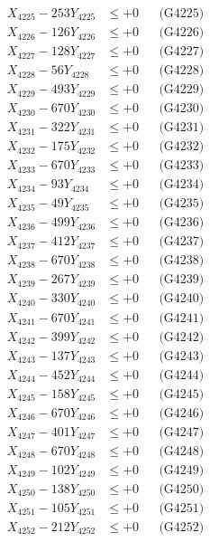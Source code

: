 \documentclass[a4paper,10pt]{article}
\begin{document}
{\begin{align}
X_{4225} - 253Y_{4225} &\leq +0 && \text{(G4225)} \\
X_{4226} - 126Y_{4226} &\leq +0 && \text{(G4226)} \\
X_{4227} - 128Y_{4227} &\leq +0 && \text{(G4227)} \\
X_{4228} - 56Y_{4228} &\leq +0 && \text{(G4228)} \\
X_{4229} - 493Y_{4229} &\leq +0 && \text{(G4229)} \\
X_{4230} - 670Y_{4230} &\leq +0 && \text{(G4230)} \\
\allowbreak
X_{4231} - 322Y_{4231} &\leq +0 && \text{(G4231)} \\
X_{4232} - 175Y_{4232} &\leq +0 && \text{(G4232)} \\
X_{4233} - 670Y_{4233} &\leq +0 && \text{(G4233)} \\
X_{4234} - 93Y_{4234} &\leq +0 && \text{(G4234)} \\
X_{4235} - 49Y_{4235} &\leq +0 && \text{(G4235)} \\
X_{4236} - 499Y_{4236} &\leq +0 && \text{(G4236)} \\
X_{4237} - 412Y_{4237} &\leq +0 && \text{(G4237)} \\
X_{4238} - 670Y_{4238} &\leq +0 && \text{(G4238)} \\
X_{4239} - 267Y_{4239} &\leq +0 && \text{(G4239)} \\
X_{4240} - 330Y_{4240} &\leq +0 && \text{(G4240)} \\
\allowbreak
X_{4241} - 670Y_{4241} &\leq +0 && \text{(G4241)} \\
X_{4242} - 399Y_{4242} &\leq +0 && \text{(G4242)} \\
X_{4243} - 137Y_{4243} &\leq +0 && \text{(G4243)} \\
X_{4244} - 452Y_{4244} &\leq +0 && \text{(G4244)} \\
X_{4245} - 158Y_{4245} &\leq +0 && \text{(G4245)} \\
X_{4246} - 670Y_{4246} &\leq +0 && \text{(G4246)} \\
X_{4247} - 401Y_{4247} &\leq +0 && \text{(G4247)} \\
X_{4248} - 670Y_{4248} &\leq +0 && \text{(G4248)} \\
X_{4249} - 102Y_{4249} &\leq +0 && \text{(G4249)} \\
X_{4250} - 138Y_{4250} &\leq +0 && \text{(G4250)} \\
\allowbreak
X_{4251} - 105Y_{4251} &\leq +0 && \text{(G4251)} \\
X_{4252} - 212Y_{4252} &\leq +0 && \text{(G4252)} \\

\end{align}}
\end{document}

